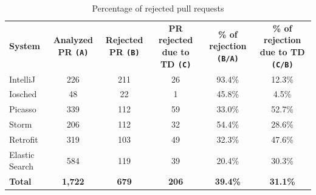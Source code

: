 \documentclass{sig-alternate}
\begin{document}
\begin{table}[!t]
\centering
\caption{Percentage of rejected pull requests}
  \begin{tabular}{lccccc}
    \rowcolor{gray!50}
{\bf System}	& \multicolumn{1}{P{2.4cm}}{\bf Analyzed PR {\scriptsize\tt (A)}} 	& \multicolumn{1}{P{2.4cm}}{\bf Rejected PR {\scriptsize\tt (B)}}	& \multicolumn{1}{P{2.8cm}}{\bf PR rejected due to TD {\scriptsize\tt (C)}}	& \multicolumn{1}{P{2.4cm}}{\bf \% of rejection {\scriptsize\tt (B/A)}}  & \multicolumn{1}{P{2.4cm}}{\bf \% of rejection due to TD {\scriptsize\tt (C/B)}} \\[0.166cm]
IntelliJ  & 	226 & 	211 & 	26 & 	93.4\% & 	12.3\%\\[0.166cm]
Iosched & 	48 & 	22 & 	1 & 	45.8\% & 	4.5\%\\[0.166cm]
Picasso & 	339 & 	112 & 	59 & 	33.0\% & 	52.7\%\\[0.166cm]
Storm & 	206 & 	112 & 	32 & 	54.4\% & 	28.6\%\\[0.166cm]
Retrofit & 	319 & 	103 & 	49 & 	32.3\%	 & 47.6\%\\[0.166cm]
Elastic Search & 	584 & 	119 & 	39 & 	20.4\%	 & 30.3\%\\[0.166cm]


    \rowcolor{gray!50}
{\bf Total}		& {\bf 1,722} & {\bf 679} & {\bf 206} &	{\bf 39.4\%}	& {\bf 31.1\%}\\[0.166cm]

  \end{tabular}

  \label{tb:rejected_pr}  
\end{table}
\end{document}
